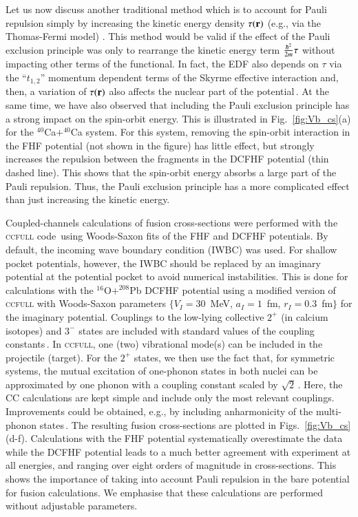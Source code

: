 Let us now discuss another traditional method which is to account for Pauli repulsion
simply by increasing the kinetic energy density $\tau({\bf r})$ (e.g., via the Thomas-Fermi model)
\citep{brink1975,zint1975,beck1978,denisov2010,nesterov2013}.
This method would be valid if the effect of the Pauli exclusion principle was only
to rearrange the kinetic energy term $\frac{\hbar^2}{2m}\tau$ without impacting other terms of the functional.
In fact, the EDF also depends on $\tau$ via the ``$t_{1,2}$'' 
momentum dependent terms of the Skyrme  effective interaction \citep{skyrme1956}
and, then, a variation of $\tau({\bf r})$ also affects the nuclear part of the potential\,\citep{brink1975,denisov2010}.
At the same time, we have also observed that including the Pauli exclusion principle 
has a strong impact on the spin-orbit energy.
This is illustrated in Fig.~\ref{fig:Vb_cs}(a) for the $^{40}$Ca$+^{40}$Ca system.
For this system, removing the spin-orbit interaction in the FHF potential  
(not shown in the figure) has little effect, but strongly increases the repulsion 
between the fragments in the DCFHF potential (thin dashed line).
This shows that the spin-orbit energy absorbs a large part of the Pauli repulsion.
Thus, the Pauli exclusion principle has a more complicated effect than just increasing the kinetic energy.

Coupled-channels calculations of fusion cross-sections 
were performed with the  \textsc{ccfull} code\,\citep{hagino1999}
using Woods-Saxon fits of the FHF and DCFHF potentials.
By default, the incoming wave boundary condition (IWBC) was used.
For shallow pocket potentials, however,
the IWBC should be replaced by an imaginary potential at the potential pocket to avoid numerical instabilities.
This is done for calculations with the $^{16}$O$+^{208}$Pb DCFHF 
potential using a modified version of \textsc{ccfull} with Woods-Saxon parameters 
$\{V_I=30$~MeV, $a_I=1$~fm, $r_I=0.3$~fm$\}$ for the imaginary potential.
Couplings to the low-lying collective $2^+$ (in calcium isotopes) and $3^-$  states are included
with standard values of the coupling constants\,\citep{morton1999,rowley2010}.
In  \textsc{ccfull}, one (two) vibrational mode(s) can be included in the projectile (target).
For the $2^+$ states, we then use the fact that, for symmetric systems,
the mutual excitation of one-phonon states in both nuclei can be approximated
by one phonon with a coupling constant scaled by $\sqrt{2}$\,\citep{esbensen1987}.
Here, the CC calculations are kept simple and include only the most relevant couplings.
Improvements could be obtained, e.g., by including anharmonicity of the multi-phonon states\,\citep{yao2016}.
The resulting fusion cross-sections are plotted in Figs.~\ref{fig:Vb_cs}(d-f). 
Calculations with the FHF potential systematically overestimate the data while the DCFHF
potential leads to a much better agreement with experiment at all energies, 
and ranging over eight orders of magnitude in cross-sections.
This shows the importance of taking into account Pauli repulsion in  the bare potential for fusion calculations.
We emphasise that these calculations are performed without adjustable parameters.

